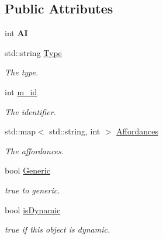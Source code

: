 \subsection*{Public Attributes}
\begin{DoxyCompactItemize}
\item 
\hypertarget{class_objects_1_1_i_object_ada16f56e05325655d57ad1aaf6cd5bf7}{int {\bfseries A\-I}}\label{class_objects_1_1_i_object_ada16f56e05325655d57ad1aaf6cd5bf7}

\item 
\hypertarget{class_objects_1_1_i_object_abb60f2a9f1a2babcbd055a355284dc87}{std\-::string \hyperlink{class_objects_1_1_i_object_abb60f2a9f1a2babcbd055a355284dc87}{Type}}\label{class_objects_1_1_i_object_abb60f2a9f1a2babcbd055a355284dc87}

\begin{DoxyCompactList}\small\item\em The type. \end{DoxyCompactList}\item 
\hypertarget{class_objects_1_1_i_object_a7812cd5cf46e2c3353fca5118e26d8a2}{int \hyperlink{class_objects_1_1_i_object_a7812cd5cf46e2c3353fca5118e26d8a2}{m\-\_\-id}}\label{class_objects_1_1_i_object_a7812cd5cf46e2c3353fca5118e26d8a2}

\begin{DoxyCompactList}\small\item\em The identifier. \end{DoxyCompactList}\item 
\hypertarget{class_objects_1_1_i_object_a4d222a9eeead55bc074b97372b75d7dd}{std\-::map$<$ std\-::string, int $>$ \hyperlink{class_objects_1_1_i_object_a4d222a9eeead55bc074b97372b75d7dd}{Affordances}}\label{class_objects_1_1_i_object_a4d222a9eeead55bc074b97372b75d7dd}

\begin{DoxyCompactList}\small\item\em The affordances. \end{DoxyCompactList}\item 
\hypertarget{class_objects_1_1_i_object_a98a45fcbb771b4b7aa9e3e517005c89d}{bool \hyperlink{class_objects_1_1_i_object_a98a45fcbb771b4b7aa9e3e517005c89d}{Generic}}\label{class_objects_1_1_i_object_a98a45fcbb771b4b7aa9e3e517005c89d}

\begin{DoxyCompactList}\small\item\em true to generic. \end{DoxyCompactList}\item 
\hypertarget{class_objects_1_1_i_object_acacfe9cceb90229b824063b47efa3171}{bool \hyperlink{class_objects_1_1_i_object_acacfe9cceb90229b824063b47efa3171}{is\-Dynamic}}\label{class_objects_1_1_i_object_acacfe9cceb90229b824063b47efa3171}

\begin{DoxyCompactList}\small\item\em true if this object is dynamic. \end{DoxyCompactList}\end{DoxyCompactItemize}
